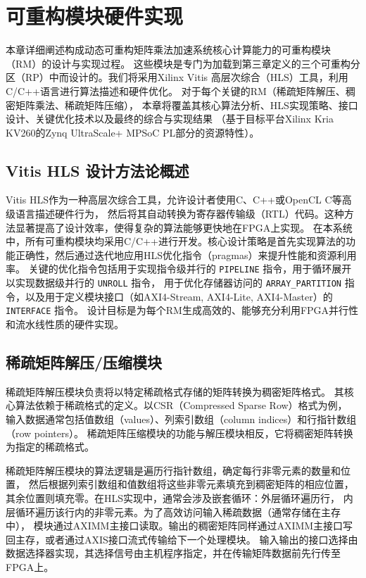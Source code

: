 \chapter{可重构模块硬件实现}

本章详细阐述构成动态可重构矩阵乘法加速系统核心计算能力的可重构模块（RM）的设计与实现过程。
这些模块是专门为加载到第三章定义的三个可重构分区（RP）中而设计的。我们将采用Xilinx Vitis 高层次综合（HLS）工具，利用C/C++语言进行算法描述和硬件优化。
对于每个关键的RM（稀疏矩阵解压、稠密矩阵乘法、稀疏矩阵压缩），
本章将覆盖其核心算法分析、HLS实现策略、接口设计、关键优化技术以及最终的综合与实现结果
（基于目标平台Xilinx Kria KV260的Zynq UltraScale+ MPSoC PL部分的资源特性）。

\section{Vitis HLS 设计方法论概述}

Vitis HLS作为一种高层次综合工具，允许设计者使用C、C++或OpenCL C等高级语言描述硬件行为，
然后将其自动转换为寄存器传输级（RTL）代码。这种方法显著提高了设计效率，使得复杂的算法能够更快地在FPGA上实现。
在本系统中，所有可重构模块均采用C/C++进行开发。核心设计策略是首先实现算法的功能正确性，然后通过迭代地应用HLS优化指令（pragmas）来提升性能和资源利用率。
关键的优化指令包括用于实现指令级并行的 \verb|PIPELINE| 指令，用于循环展开以实现数据级并行的 \verb|UNROLL| 指令，
用于优化存储器访问的 \verb|ARRAY_PARTITION| 指令，以及用于定义模块接口（如AXI4-Stream, AXI4-Lite, AXI4-Master）的 \verb|INTERFACE| 指令。
设计目标是为每个RM生成高效的、能够充分利用FPGA并行性和流水线性质的硬件实现。

\section{稀疏矩阵解压/压缩模块}

稀疏矩阵解压模块负责将以特定稀疏格式存储的矩阵转换为稠密矩阵格式。
其核心算法依赖于稀疏格式的定义。以CSR（Compressed Sparse Row）格式为例，
输入数据通常包括值数组（values）、列索引数组（column indices）和行指针数组（row pointers）。
稀疏矩阵压缩模块的功能与解压模块相反，它将稠密矩阵转换为指定的稀疏格式。

稀疏矩阵解压模块的算法逻辑是遍历行指针数组，确定每行非零元素的数量和位置，
然后根据列索引数组和值数组将这些非零元素填充到稠密矩阵的相应位置，
其余位置则填充零。在HLS实现中，通常会涉及嵌套循环：外层循环遍历行，
内层循环遍历该行内的非零元素。为了高效访问输入稀疏数据（通常存储在主存中），
模块通过AXIMM主接口读取。输出的稠密矩阵同样通过AXIMM主接口写回主存，或者通过AXIS接口流式传输给下一个处理模块。
输入输出的接口选择由数据选择器实现，其选择信号由主机程序指定，并在传输矩阵数据前先行传至FPGA上。

